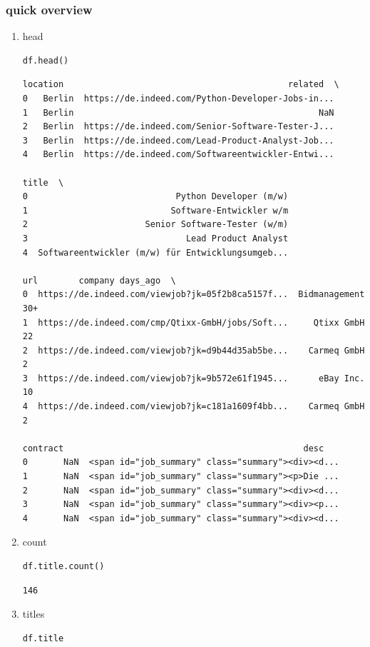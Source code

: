 \documentclass[11pt]{article}
\begin{document}
\subsubsection{quick overview}
\label{sec:org191379f}
\begin{enumerate}
\item head
\label{sec:org8b55b43}
\begin{verbatim}
df.head()
\end{verbatim}

\begin{verbatim}
location                                            related  \
0   Berlin  https://de.indeed.com/Python-Developer-Jobs-in...
1   Berlin                                                NaN
2   Berlin  https://de.indeed.com/Senior-Software-Tester-J...
3   Berlin  https://de.indeed.com/Lead-Product-Analyst-Job...
4   Berlin  https://de.indeed.com/Softwareentwickler-Entwi...

title  \
0                             Python Developer (m/w)
1                            Software-Entwickler w/m
2                       Senior Software-Tester (w/m)
3                               Lead Product Analyst
4  Softwareentwickler (m/w) für Entwicklungsumgeb...

url        company days_ago  \
0  https://de.indeed.com/viewjob?jk=05f2b8ca5157f...  Bidmanagement      30+
1  https://de.indeed.com/cmp/Qtixx-GmbH/jobs/Soft...     Qtixx GmbH       22
2  https://de.indeed.com/viewjob?jk=d9b44d35ab5be...    Carmeq GmbH        2
3  https://de.indeed.com/viewjob?jk=9b572e61f1945...      eBay Inc.       10
4  https://de.indeed.com/viewjob?jk=c181a1609f4bb...    Carmeq GmbH        2

contract                                               desc
0       NaN  <span id="job_summary" class="summary"><div><d...
1       NaN  <span id="job_summary" class="summary"><p>Die ...
2       NaN  <span id="job_summary" class="summary"><div><d...
3       NaN  <span id="job_summary" class="summary"><div><p...
4       NaN  <span id="job_summary" class="summary"><div><d...
\end{verbatim}

\item count
\label{sec:org5a360c1}
\begin{verbatim}
df.title.count()
\end{verbatim}

\begin{verbatim}
146
\end{verbatim}
\item titles
\label{sec:org1cc370c}
\begin{verbatim}
df.title
\end{verbatim}
\end{enumerate}
\end{document}
